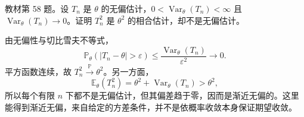 \begin{example}
\label{ex:study-ch6-ex58}
教材第 58 题。设 $T_n$ 是 $\theta$ 的无偏估计，$0<\operatorname{Var}_\theta(T_n)<\infty$ 且 $\operatorname{Var}_\theta(T_n)\to0$。证明 $T_n^2$ 是 $\theta^2$ 的相合估计，却不是无偏估计。
\end{example}

\begin{solve}
由无偏性与切比雪夫不等式，
\[
  \mathbb P_\theta(|T_n-\theta|>\varepsilon)
     \le\frac{\operatorname{Var}_\theta(T_n)}{\varepsilon^2}
     \longrightarrow0.
\]
平方函数连续，故 $T_n^2\xrightarrow{\mathbb P}\theta^2$。另一方面，
\[
  \mathbb E_\theta(T_n^2)
      =\theta^2+\operatorname{Var}_\theta(T_n)>\theta^2,
\]
所以每个有限 $n$ 下都不是无偏估计，但其偏差趋于零，因而是渐近无偏的。这里能得到渐近无偏，来自给定的方差条件，并不是依概率收敛本身保证期望收敛。
\end{solve}





